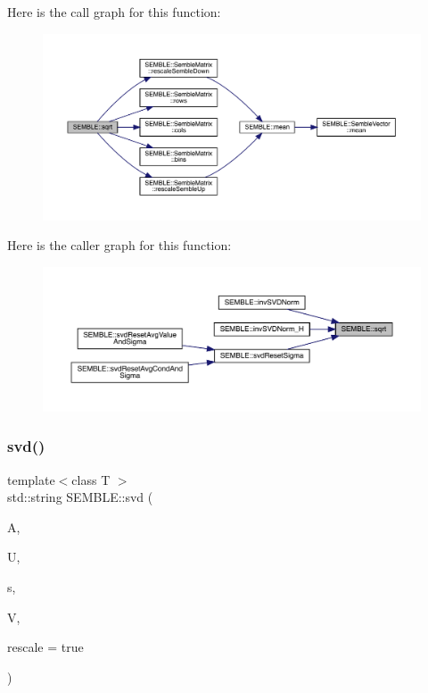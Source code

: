 Here is the call graph for this function\+:
\nopagebreak
\begin{figure}[H]
\begin{center}
\leavevmode
\includegraphics[width=350pt]{d7/dfd/namespaceSEMBLE_a6843034758bd3b7a0fa76961bc4325f6_cgraph}
\end{center}
\end{figure}
Here is the caller graph for this function\+:
\nopagebreak
\begin{figure}[H]
\begin{center}
\leavevmode
\includegraphics[width=350pt]{d7/dfd/namespaceSEMBLE_a6843034758bd3b7a0fa76961bc4325f6_icgraph}
\end{center}
\end{figure}
\mbox{\label{namespaceSEMBLE_acc7fdc62577ac500ca167f9fc7ed8fe9}} 
\subsubsection{\texorpdfstring{svd()}{svd()}}
{\footnotesize\ttfamily template$<$class T $>$ \\
std\+::string S\+E\+M\+B\+L\+E\+::svd (\begin{DoxyParamCaption}\item[{const \mbox{\hyperlink{structSEMBLE_1_1SembleMatrix}{Semble\+Matrix}}$<$ T $>$ \&}]{A,  }\item[{\mbox{\hyperlink{structSEMBLE_1_1SembleMatrix}{Semble\+Matrix}}$<$ T $>$ \&}]{U,  }\item[{\mbox{\hyperlink{structSEMBLE_1_1SembleVector}{Semble\+Vector}}$<$ double $>$ \&}]{s,  }\item[{\mbox{\hyperlink{structSEMBLE_1_1SembleMatrix}{Semble\+Matrix}}$<$ T $>$ \&}]{V,  }\item[{bool}]{rescale = {\ttfamily true} }\end{DoxyParamCaption})}

